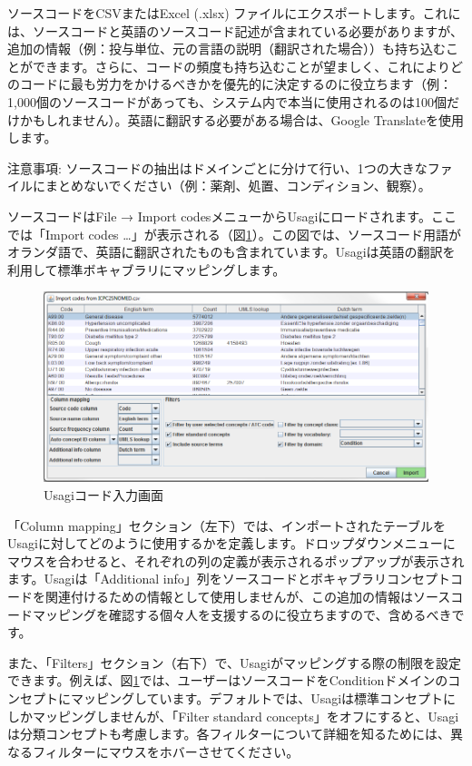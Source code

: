 \documentclass[
  11pt]{book}
\theoremstyle{definition}
\theoremstyle{definition}
\theoremstyle{definition}
\theoremstyle{definition}
\theoremstyle{remark}
\begin{document}
ソースコードをCSVまたはExcel (.xlsx) ファイルにエクスポートします。これには、ソースコードと英語のソースコード記述が含まれている必要がありますが、追加の情報（例：投与単位、元の言語の説明（翻訳された場合））も持ち込むことができます。さらに、コードの頻度も持ち込むことが望ましく、これによりどのコードに最も労力をかけるべきかを優先的に決定するのに役立ちます（例：1,000個のソースコードがあっても、システム内で本当に使用されるのは100個だけかもしれません）。英語に翻訳する必要がある場合は、Google Translateを使用します。

注意事項: ソースコードの抽出はドメインごとに分けて行い、1つの大きなファイルにまとめないでください（例：薬剤、処置、コンディション、観察）。

ソースコードはFile → Import codesメニューからUsagiにロードされます。ここでは「Import codes \ldots」が表示される（図\ref{fig:usagiImport}）。この図では、ソースコード用語がオランダ語で、英語に翻訳されたものも含まれています。Usagiは英語の翻訳を利用して標準ボキャブラリにマッピングします。

\begin{figure}

{\centering \includegraphics[width=1\linewidth]{images/ExtractTransformLoad/usagiImport} 

}

\caption{Usagiコード入力画面}\label{fig:usagiImport}
\end{figure}

「Column mapping」セクション（左下）では、インポートされたテーブルをUsagiに対してどのように使用するかを定義します。ドロップダウンメニューにマウスを合わせると、それぞれの列の定義が表示されるポップアップが表示されます。Usagiは「Additional info」列をソースコードとボキャブラリコンセプトコードを関連付けるための情報として使用しませんが、この追加の情報はソースコードマッピングを確認する個々人を支援するのに役立ちますので、含めるべきです。

また、「Filters」セクション（右下）で、Usagiがマッピングする際の制限を設定できます。例えば、図\ref{fig:usagiImport}では、ユーザーはソースコードをConditionドメインのコンセプトにマッピングしています。デフォルトでは、Usagiは標準コンセプトにしかマッピングしませんが、「Filter standard concepts」をオフにすると、Usagiは分類コンセプトも考慮します。各フィルターについて詳細を知るためには、異なるフィルターにマウスをホバーさせてください。
\end{document}
